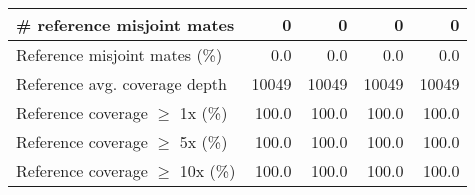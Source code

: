 \documentclass[12pt,a4paper]{article}
\begin{document}
\begin{table}[ht]
\begin{center}
\begin{tabular}{|l*{4}{|r}|}
\# reference misjoint mates & 0 & 0 & 0 & 0 \\ \hline
Reference misjoint mates (\%) & 0.0 & 0.0 & 0.0 & 0.0 \\ \hline
Reference avg. coverage depth & 10049 & 10049 & 10049 & 10049 \\ \hline
Reference coverage $\geq$ 1x (\%) & 100.0 & 100.0 & 100.0 & 100.0 \\ \hline
Reference coverage $\geq$ 5x (\%) & 100.0 & 100.0 & 100.0 & 100.0 \\ \hline
Reference coverage $\geq$ 10x (\%) & 100.0 & 100.0 & 100.0 & 100.0 \\ \hline
\end{tabular}
\end{center}
\end{table}
\end{document}
